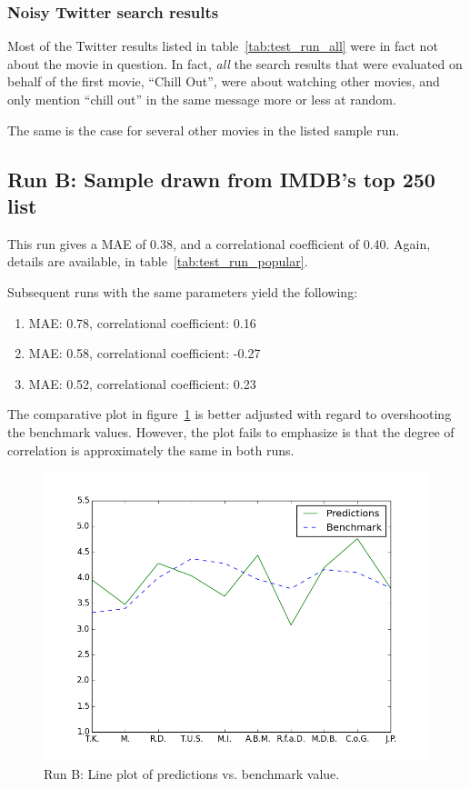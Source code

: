 \subsubsection{Noisy Twitter search results}

Most of the Twitter results listed in table~\ref{tab:test_run_all} were in fact not about the movie in question. In fact, \emph{all} the search results that were evaluated on behalf of the first movie, ``Chill Out'', were about watching other movies, and only mention ``chill out'' in the same message more or less at random.

The same is the case for several other movies in the listed sample run.

\subsection{Run B: Sample drawn from IMDB's top 250 list}

This run gives a MAE of 0.38, and a correlational coefficient of 0.40. Again, details are available, in table~\ref{tab:test_run_popular}.

Subsequent runs with the same parameters yield the following:

\begin{enumerate}
  \item MAE: 0.78, correlational coefficient: 0.16
  \item MAE: 0.58, correlational coefficient: -0.27
  \item MAE: 0.52, correlational coefficient: 0.23
\end{enumerate}

The comparative plot in figure~\ref{fig:predictions_benchmark_pop} is better adjusted with regard to overshooting the benchmark values. However, the plot fails to emphasize is that the degree of correlation is approximately the same in both runs.

\begin{figure}[h]
  \centering
    \includegraphics[width=.8\textwidth]{Figures/plots/predictions_benchmark_pop}
  \caption{Run B: Line plot of predictions vs. benchmark value.}
  \label{fig:predictions_benchmark_pop}
\end{figure}

